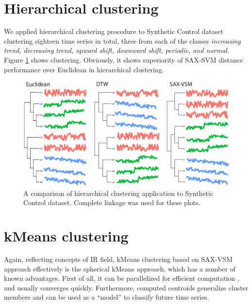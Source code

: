 \documentclass{llncs}
\begin{document}
\section{Hierarchical clustering}
We applied hierarchical clustering procedure to Synthetic Control dataset clustering eighteen
time series in total, three from each of the classes \textit{increasing trend, decreasing trend,
upward shift, downward shift, periodic, and normal}. Figure \ref{fig:hc} shows
clustering. Obviously, it shows superiority of SAX-SVM distance performance over Euclidean in
hierarchical clustering.

\begin{figure}[tbp]
   \centering
   \includegraphics[width=115mm]{figures/clustering.eps}
   \caption{A comparison of hierarchical clustering application to Synthetic Control dataset.
   Complete linkage was used for these plots.
   }
   \label{fig:hc}
\end{figure}

\section{kMeans clustering}
Again, reflecting concepts of IR field, kMeans clustering based on SAX-VSM approach effectively
is the spherical kMeans approach, which has a number of known advantages. First of all, it can be
parallelized for efficient computation \cite{modha}, and usually converges quickly. Furthermore,
computed centroids generalize cluster members and can be used as a ``model'' to classify future 
time series.
\end{document}
